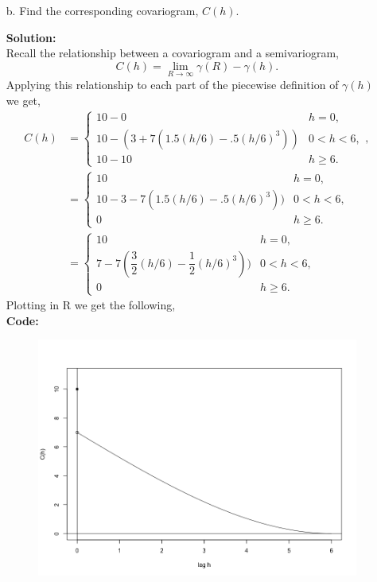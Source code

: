 \documentclass[12pt]{article}
\makeatletter
\theoremstyle{homework}
\newenvironment{exercise}[1]
{\def\@currentlabel{#1}\exercisecore}
{\endexercisecore}
\newcommand{\localhead}[1]{\par\smallskip\noindent\textbf{#1}\nobreak\\}%
\newcommand\solution{\localhead{Solution:}}
\makeatother
\begin{document}
\begin{exercise}{4}
\begin{enumerate}
    \item[b.] Find the corresponding covariogram, $C(h)$. \\
    \solution Recall the relationship between a covariogram and a semivariogram, 
    \begin{equation*}
      C(h) = \lim_{R \to \infty}\gamma(R) - \gamma(h).
    \end{equation*} 
    Applying this relationship to each part of the piecewise definition of $\gamma(h)$ we get, 
    \begin{align*}
      C(h) &= \begin{cases}
        10 - 0 & h = 0,\\
        10 -  (3 + 7(1.5(h/6) - .5(h/6)^3)) & 0 < h < 6,\\
        10 - 10 & h \geq 6.
      \end{cases},\\
      &= \begin{cases}
        10 & h = 0,\\
        10-3-7(1.5(h/6) - .5(h/6)^3)) & 0 < h < 6,\\
        0 & h \geq 6.
      \end{cases}\\
      &= \begin{cases}
        10 & h = 0,\\
        7-7(\dfrac{3}{2}(h/6) - \dfrac{1}{2}(h/6)^3)) & 0 < h < 6,\\
        0 & h \geq 6.
      \end{cases}
    \end{align*}
    Plotting in R we get the following, \\
    \textbf{Code:}
    \begin{center}
    
    \end{center}

    \begin{figure}[H]
      \begin{center}
      \includegraphics[width = .85\textwidth]{Rplot04.png}
      \end{center}
    \end{figure}



\end{enumerate}
\end{exercise}
\end{document}
